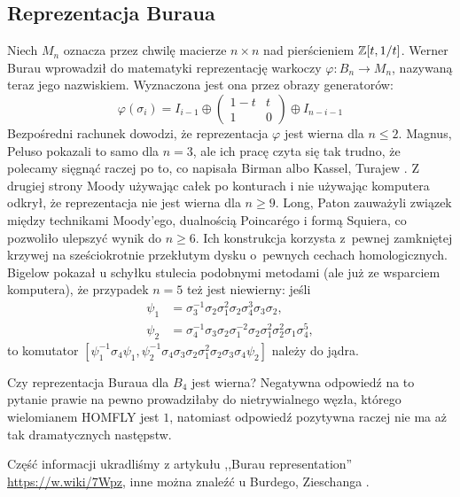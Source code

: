 %

\subsection{Reprezentacja Buraua}
Niech $M_n$ oznacza przez chwilę macierze $n \times n$ nad pierścieniem $\mathbb Z[t, 1/t]$.
Werner Burau \cite{burau1935} wprowadził do matematyki reprezentację warkoczy $\varphi \colon B_n \to M_{n}$, nazywaną teraz jego nazwiskiem.
%
%
Wyznaczona jest ona przez obrazy generatorów:
\begin{equation}
    \varphi(\sigma_i) = I_{i-1} \oplus \begin{pmatrix}
        1-t & t \\
        1   & 0
    \end{pmatrix} \oplus I_{n-i-1}
\end{equation}
Bezpośredni rachunek dowodzi, że reprezentacja $\varphi$ jest wierna dla $n \le 2$.
Magnus, Peluso \cite{magnus1969} pokazali to samo dla $n = 3$, ale ich pracę czyta się tak trudno, że polecamy sięgnąć raczej po to, co napisała Birman \cite[s. 129]{birman1974} albo Kassel, Turajew \cite[s. 110]{kassel2008}.
Z drugiej strony Moody \cite{moody1991} używając całek po konturach i nie używając komputera odkrył, że reprezentacja nie jest wierna dla $n \ge 9$.
%
Long, Paton \cite{long1993} zauważyli związek między technikami Moody'ego, dualnością Poincarégo i formą Squiera, co pozwoliło ulepszyć wynik do $n \ge 6$.
%
%
Ich konstrukcja korzysta z~pewnej zamkniętej krzywej na sześciokrotnie przekłutym dysku o~pewnych cechach homologicznych.
Bigelow \cite{bigelow1999} pokazał u schyłku stulecia podobnymi metodami (ale już ze wsparciem komputera), że przypadek $n = 5$ też jest niewierny: jeśli
%
\begin{align}
    \psi_1 & = \sigma_3^{{-1}}\sigma_2\sigma_1^2\sigma_2\sigma_4^3\sigma_3\sigma_2, \\
\psi_2 & = \sigma_4^{{-1}}\sigma_3\sigma_2\sigma_1^{{-2}}\sigma_2\sigma_1^2\sigma_2^2\sigma_1\sigma_4^5,
\end{align}
to komutator $[\psi_1^{{-1}}\sigma_4\psi_1,\psi_2^{{-1}}\sigma_4\sigma_3\sigma_2\sigma_1^2\sigma_2\sigma_3\sigma_4\psi_2]$ należy do jądra.

Czy reprezentacja Buraua dla $B_4$ jest wierna?
Negatywna odpowiedź na to pytanie prawie na pewno prowadziłaby do
nietrywialnego węzła, którego wielomianem HOMFLY jest $1$,
natomiast odpowiedź pozytywna raczej nie ma aż tak dramatycznych następstw.

Część informacji ukradliśmy z artykułu ,,Burau representation'' \url{https://w.wiki/7Wpz}, inne można znaleźć u Burdego, Zieschanga \cite[s. 181]{burde2014}.

%